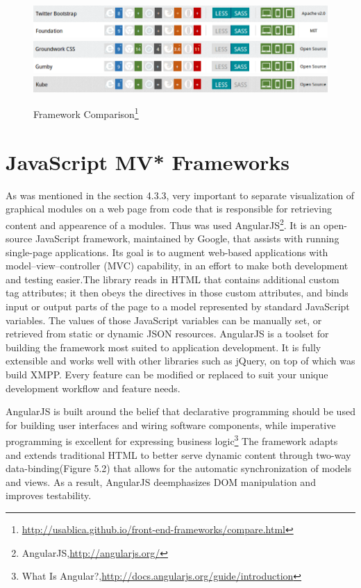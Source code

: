 \begin{figure}[!ht]
\centering
\includegraphics[scale=0.7]{images/Bootstrap&Foundation.png}
\includegraphics[scale=0.7]{images/Groundwork&Gumby.png} 
\includegraphics[scale=0.7]{images/Kube.png}  
\caption[Framework Comparison]{Framework Comparison\footnote{\url{http://usablica.github.io/front-end-frameworks/compare.html}}}
\label{img:Bootstrap&Foundation.png}
\label{img:Groundwork&Gumby.png}   
\label{img:Kube.png}                          
\end{figure}

\section{JavaScript MV* Frameworks}
	As was mentioned in the section 4.3.3, very important to separate visualization of graphical modules on a web page from code that is responsible for retrieving content and appearence of a modules. Thus was used AngularJS\footnote{AngularJS,\url{http://angularjs.org/}}. It is an open-source JavaScript framework, maintained by Google, that assists with running single-page applications. Its goal is to augment web-based applications with model–view–controller (MVC) capability, in an effort to make both development and testing easier.The library reads in HTML that contains additional custom tag attributes; it then obeys the directives in those custom attributes, and binds input or output parts of the page to a model represented by standard JavaScript variables. The values of those JavaScript variables can be manually set, or retrieved from static or dynamic JSON resources\cite{ wiki:angular}. AngularJS is a toolset for building the framework most suited to application development. It is fully extensible and works well with other libraries such as jQuery, on top of which was build XMPP. Every feature can be modified or replaced to suit your unique development workflow and feature needs.

	AngularJS is built around the belief that declarative programming should be used for building user interfaces and wiring software components, while imperative programming is excellent for expressing business logic\footnote{What Is Angular?,\url{http://docs.angularjs.org/guide/introduction}} The framework adapts and extends traditional HTML to better serve dynamic content through two-way data-binding(Figure 5.2) that allows for the automatic synchronization of models and views. As a result, AngularJS deemphasizes DOM manipulation and improves testability.

